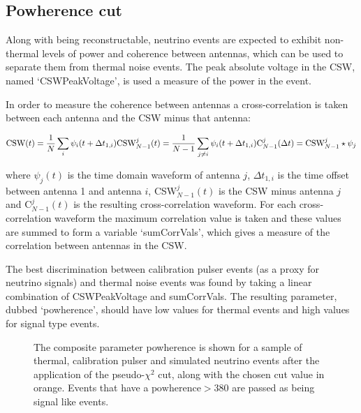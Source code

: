 \subsection{Powherence cut}
\label{sec:Analysis:Thermal-Cuts:Powherence}

Along with being reconstructable, neutrino events are expected to exhibit non-thermal levels of power and coherence between antennas, which can be used to separate them from thermal noise events. The peak absolute voltage in the CSW, named `CSWPeakVoltage', is used a measure of the power in the event. 

In order to measure the coherence between antennas a cross-correlation is taken between each antenna and the CSW minus that antenna:

\begin{equation}
  \mbox{CSW}(t) = \frac{1}{N}\sum_{i} \psi_{i}(t+\Delta t_{1,i})\\
  \mbox{CSW}_{N-1}^{j}(t) = \frac{1}{N-1}\sum_{j \neq i} \psi_{i}(t+\Delta t_{1,i})\\
  \mbox{C}_{N-1}^{j}(\Delta t) = {\mbox{CSW}_{N-1}^{j} \star \psi_{j}}
\end{equation}

\noindent where $\psi_{j}(t)$ is the time domain waveform of antenna $j$, $\Delta t_{1,i}$ is the time offset between antenna 1 and antenna $i$, CSW$_{N-1}^{j}(t)$ is the CSW minus antenna $j$ and C$_{N-1}^{j}(t)$ is the resulting cross-correlation waveform. For each cross-correlation waveform the maximum correlation value is taken and these values are summed to form a variable `sumCorrVals', which gives a measure of the correlation between antennas in the CSW.

The best discrimination between calibration pulser events (as a proxy for neutrino signals) and thermal noise events was found by taking a linear combination of CSWPeakVoltage and sumCorrVals. The resulting parameter, dubbed `powherence', should have low values for thermal events and high values for signal type events.


\begin{figure}[htpb]
  \hfill
  \caption{The composite parameter powherence is shown for a sample of thermal, calibration pulser and simulated neutrino events after the application of the pseudo-$\chi^{2}$ cut, along with the chosen cut value in orange. Events that have a $\mbox{powherence} > 380$ are passed as being signal like events.}
  \label{fig:Analysis:Thermal-Cuts:Powherence}
\end{figure}

